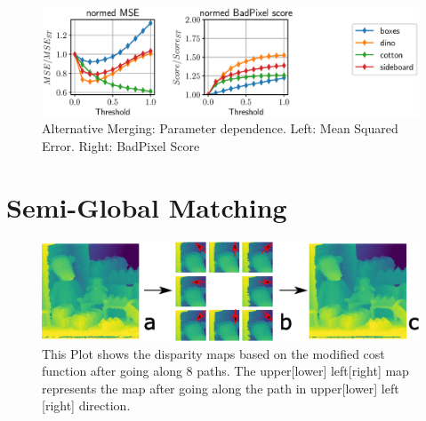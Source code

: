 \documentclass  [
  paper    = a4,
  BCOR     = 10mm,
  twoside,
  fontsize = 12pt,
  fleqn,
  toc      = bibnumbered,
  toc      = listofnumbered,
  numbers  = noendperiod,
  headings = normal,
  listof   = leveldown,
  version  = 3.03
]                                       {scrreprt}
\begin{document}
\begin{figure}
	\centering
	\includegraphics[width=1\linewidth]{images/choose_lower_params}
	\caption[Alternative Merging: Parameter dependence]{Alternative Merging: Parameter dependence. Left: Mean Squared Error. Right: BadPixel Score}
	\label{fig:chooselowerparams}
\end{figure}






\section{Semi-Global Matching}

\begin{figure}
	\centering
	\includegraphics[width=1\linewidth]{images/subplot_sgm}
	\caption[SGM from different directions]{This Plot shows the disparity maps based on the modified cost function after going along 8 paths. The upper[lower] left[right] map represents the map after going along the path in upper[lower] left [right] direction.}
	\label{fig:subplotsgm}
\end{figure}
\end{document}
